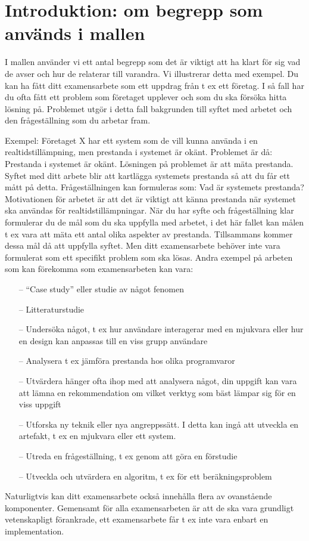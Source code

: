 \section*{Introduktion: om begrepp som används i mallen}

I mallen använder vi ett antal begrepp som det är viktigt att ha klart för sig vad de avser och hur de relaterar till varandra.
Vi illustrerar detta med exempel.
Du kan ha fått ditt examensarbete som ett uppdrag från t ex ett företag.
I så fall har du ofta fått ett problem som företaget upplever och som du ska försöka hitta lösning på. 
Problemet utgör i detta fall bakgrunden till syftet med arbetet och den frågeställning som du arbetar fram.

Exempel: Företaget X har ett system som de vill kunna använda i en realtidstillämpning, men prestanda i systemet är okänt. 
Problemet är då: Prestanda i systemet är okänt.
Lösningen på problemet är att mäta prestanda.
Syftet med ditt arbete blir att kartlägga systemets prestanda så att du får ett mått på detta. 
Frågeställningen kan formuleras som: Vad är systemets prestanda? Motivationen för arbetet är att det är viktigt att känna prestanda när systemet ska användas för realtidstillämpningar.
När du har syfte och frågeställning klar formulerar du de mål som du ska uppfylla med arbetet, i det här fallet kan målen t ex vara att mäta ett antal olika aspekter av prestanda. 
Tillsammans kommer dessa mål då att uppfylla syftet. 
Men ditt examensarbete behöver inte vara formulerat som ett specifikt problem som ska lösas.
Andra exempel på arbeten som kan förekomma som examensarbeten kan vara:
\begin{itemize}
\item[--]	``Case study'' eller studie av något fenomen
\item[--]	Litteraturstudie
\item[--]	Undersöka något, t ex hur användare interagerar med en mjukvara eller hur en design kan anpassas till en viss grupp användare
\item[--]	Analysera t ex jämföra prestanda hos olika programvaror
\item[--]	Utvärdera hänger ofta ihop med att analysera något, din uppgift kan vara att lämna en rekommendation om vilket verktyg som bäst lämpar sig för en viss uppgift
\item[--]	Utforska ny teknik eller nya angreppssätt. I detta kan ingå att utveckla en artefakt, t ex en mjukvara eller ett system. 
\item[--]	Utreda en frågeställning, t ex genom att göra en förstudie
\item[--]	Utveckla och utvärdera en algoritm, t ex för ett beräkningsproblem
\end{itemize}
Naturligtvis kan ditt examensarbete också innehålla flera av ovanstående komponenter. 
Gemensamt för alla examensarbeten är att de ska vara grundligt vetenskapligt förankrade, ett examensarbete får t ex inte vara enbart en implementation.

